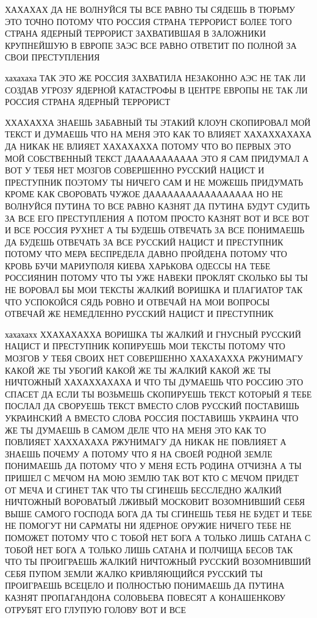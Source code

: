 ХАХАХАХ ДА НЕ ВОЛНУЙСЯ ТЫ ВСЕ РАВНО ТЫ СЯДЕШЬ В ТЮРЬМУ ЭТО ТОЧНО ПОТОМУ ЧТО
РОССИЯ СТРАНА ТЕРРОРИСТ БОЛЕЕ ТОГО СТРАНА ЯДЕРНЫЙ ТЕРРОРИСТ ЗАХВАТИВШАЯ В
ЗАЛОЖНИКИ КРУПНЕЙШУЮ В ЕВРОПЕ ЗАЭС ВСЕ РАВНО ОТВЕТИТ ПО ПОЛНОЙ ЗА СВОИ
ПРЕСТУПЛЕНИЯ





хахахаха ТАК ЭТО ЖЕ РОССИЯ ЗАХВАТИЛА НЕЗАКОННО АЭС НЕ ТАК ЛИ СОЗДАВ УГРОЗУ
ЯДЕРНОЙ КАТАСТРОФЫ В ЦЕНТРЕ ЕВРОПЫ НЕ ТАК ЛИ РОССИЯ СТРАНА ЯДЕРНЫЙ ТЕРРОРИСТ



ХХАХАХХА ЗНАЕШЬ ЗАБАВНЫЙ ТЫ ЭТАКИЙ КЛОУН СКОПИРОВАЛ МОЙ ТЕКСТ И ДУМАЕШЬ ЧТО НА
МЕНЯ ЭТО КАК ТО ВЛИЯЕТ ХАХАХХАХАХА ДА НИКАК НЕ ВЛИЯЕТ ХАХАХАХХА ПОТОМУ ЧТО ВО
ПЕРВЫХ ЭТО МОЙ СОБСТВЕННЫЙ ТЕКСТ ДААААААААААА ЭТО Я САМ ПРИДУМАЛ А ВОТ У ТЕБЯ
НЕТ МОЗГОВ СОВЕРШЕННО РУССКИЙ НАЦИСТ И ПРЕСТУПНИК ПОЭТОМУ ТЫ НИЧЕГО САМ И НЕ
МОЖЕШЬ ПРИДУМАТЬ КРОМЕ КАК СВОРОВАТЬ ЧУЖОЕ ДААААААААААААААААА НО НЕ ВОЛНУЙСЯ
ПУТИНА ТО ВСЕ РАВНО КАЗНЯТ ДА ПУТИНА БУДУТ СУДИТЬ ЗА ВСЕ ЕГО ПРЕСТУПЛЕНИЯ А
ПОТОМ ПРОСТО КАЗНЯТ ВОТ И ВСЕ ВОТ И ВСЕ РОССИЯ РУХНЕТ А ТЫ БУДЕШЬ ОТВЕЧАТЬ ЗА
ВСЕ ПОНИМАЕШЬ ДА БУДЕШЬ ОТВЕЧАТЬ ЗА ВСЕ РУССКИЙ НАЦИСТ И ПРЕСТУПНИК ПОТОМУ ЧТО
МЕРА БЕСПРЕДЕЛА ДАВНО ПРОЙДЕНА ПОТОМУ ЧТО КРОВЬ БУЧИ МАРИУПОЛЯ КИЕВА ХАРЬКОВА
ОДЕССЫ НА ТЕБЕ РОССИЯНИН ПОТОМУ ЧТО ТЫ УЖЕ НАВЕКИ ПРОКЛЯТ СКОЛЬКО БЫ ТЫ НЕ
ВОРОВАЛ БЫ МОИ ТЕКСТЫ ЖАЛКИЙ ВОРИШКА И ПЛАГИАТОР ТАК ЧТО УСПОКОЙСЯ СЯДЬ РОВНО И
ОТВЕЧАЙ НА МОИ ВОПРОСЫ ОТВЕЧАЙ ЖЕ НЕМЕДЛЕННО РУССКИЙ НАЦИСТ И ПРЕСТУПНИК

хахахахх ХХАХАХАХХА ВОРИШКА ТЫ ЖАЛКИЙ И ГНУСНЫЙ РУССКИЙ НАЦИСТ И ПРЕСТУПНИК КОПИРУЕШЬ
МОИ ТЕКСТЫ ПОТОМУ ЧТО МОЗГОВ У ТЕБЯ СВОИХ НЕТ СОВЕРШЕННО ХАХАХАХХА РЖУНИМАГУ
КАКОЙ ЖЕ ТЫ УБОГИЙ КАКОЙ ЖЕ ТЫ ЖАЛКИЙ КАКОЙ ЖЕ ТЫ НИЧТОЖНЫЙ ХАХАХХАХАХА
И ЧТО ТЫ ДУМАЕШЬ ЧТО РОССИЮ ЭТО СПАСЕТ ДА ЕСЛИ ТЫ ВОЗЬМЕШЬ СКОПИРУЕШЬ ТЕКСТ
КОТОРЫЙ Я ТЕБЕ ПОСЛАЛ ДА СВОРУЕШЬ ТЕКСТ ВМЕСТО СЛОВ РУССКИЙ ПОСТАВИШЬ УКРАИНСКИЙ
А ВМЕСТО СЛОВА РОССИЯ ПОСТАВИШЬ УКРАИНА ЧТО ЖЕ ТЫ ДУМАЕШЬ В САМОМ ДЕЛЕ
ЧТО НА МЕНЯ ЭТО КАК ТО ПОВЛИЯЕТ ХАХХАХАХА РЖУНИМАГУ ДА НИКАК НЕ ПОВЛИЯЕТ А ЗНАЕШЬ ПОЧЕМУ
А ПОТОМУ ЧТО Я НА СВОЕЙ РОДНОЙ ЗЕМЛЕ ПОНИМАЕШЬ ДА ПОТОМУ ЧТО У МЕНЯ ЕСТЬ РОДИНА ОТЧИЗНА
А ТЫ ПРИШЕЛ С МЕЧОМ НА МОЮ ЗЕМЛЮ ТАК ВОТ КТО С МЕЧОМ ПРИДЕТ ОТ МЕЧА И СГИНЕТ ТАК ЧТО
ТЫ СГИНЕШЬ БЕССЛЕДНО ЖАЛКИЙ НИЧТОЖНЫЙ ВОРОВАТЫЙ ЛЖИВЫЙ МОСКОВИТ ВОЗОМНИВШИЙ СЕБЯ ВЫШЕ САМОГО ГОСПОДА 
БОГА ДА ТЫ СГИНЕШЬ ТЕБЯ НЕ БУДЕТ И ТЕБЕ НЕ ПОМОГУТ НИ САРМАТЫ НИ ЯДЕРНОЕ ОРУЖИЕ НИЧЕГО
ТЕБЕ НЕ ПОМОЖЕТ ПОТОМУ ЧТО С ТОБОЙ НЕТ БОГА А ТОЛЬКО ЛИШЬ САТАНА С ТОБОЙ НЕТ БОГА А ТОЛЬКО ЛИШЬ
САТАНА И ПОЛЧИЩА БЕСОВ ТАК ЧТО ТЫ ПРОИГРАЕШЬ ЖАЛКИЙ НИЧТОЖНЫЙ РУССКИЙ ВОЗОМНИВШИЙ СЕБЯ ПУПОМ ЗЕМЛИ
ЖАЛКО КРИВЛЯЮЩИЙСЯ РУССКИЙ ТЫ ПРОИГРАЕШЬ ВСЕЦЕЛО И ПОЛНОСТЬЮ ПОНИМАЕШЬ ДА
ПУТИНА КАЗНЯТ ПРОПАГАНДОНА СОЛОВЬЕВА ПОВЕСЯТ А КОНАШЕНКОВУ ОТРУБЯТ ЕГО ГЛУПУЮ ГОЛОВУ
ВОТ И ВСЕ

